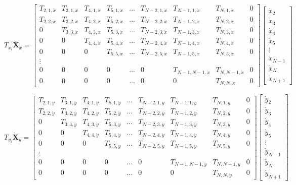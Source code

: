 \documentclass[12pt,letterpaper,titlepage]{article}
\begin{document}
\[
T_{\dot{x}_i}\mathbf{\dot{X}}_{\dot{x}} = \begin{bmatrix}
T_{2,1,\dot{x}}&T_{3,1,\dot{x}}&T_{4,1,\dot{x}}&T_{5,1,\dot{x}}&\hdots&T_{N-2,1,\dot{x}}&T_{N-1,1,\dot{x}}&T_{N,1,\dot{x}}&0\\
T_{2,2,\dot{x}}&T_{3,2,\dot{x}}&T_{4,2,\dot{x}}&T_{5,2,\dot{x}}&\hdots&T_{N-2,2,\dot{x}}&T_{N-1,2,\dot{x}}&T_{N,2,\dot{x}}&0\\
0&T_{3,3,\dot{x}}&T_{4,3,\dot{x}}&T_{5,3,\dot{x}}&\hdots&T_{N-2,3,\dot{x}}&T_{N-1,3,\dot{x}}&T_{N,3,\dot{x}}&0\\
0&0&T_{4,4,\dot{x}}&T_{5,4,\dot{x}}&\hdots&T_{N-2,4,\dot{x}}&T_{N-1,4,\dot{x}}&T_{N,4,\dot{x}}&0\\
0&0&0&T_{5,5,\dot{x}}&\hdots&T_{N-2,5,\dot{x}}&T_{N-1,5,\dot{x}}&T_{N,5,\dot{x}}&0\\
\vdots\\
0&0&0&0&\hdots&0&T_{N-1,N-1,\dot{x}}&T_{N,N-1,\dot{x}}&0\\
0&0&0&0&\hdots&0&0&T_{N,N,\dot{x}}&0
\end{bmatrix}
\begin{bmatrix}
\dot{x}_2\\
\dot{x}_3\\
\dot{x}_4\\
\dot{x}_5\\
\vdots\\
\dot{x}_{N-1}\\
\dot{x}_{N}\\
\dot{x}_{N+1}
\end{bmatrix}
\]

\[
T_{\dot{y}_i}\mathbf{\dot{X}}_{\dot{y}} = \begin{bmatrix}
T_{2,1,\dot{y}}&T_{3,1,\dot{y}}&T_{4,1,\dot{y}}&T_{5,1,\dot{y}}&\hdots&T_{N-2,1,\dot{y}}&T_{N-1,1,\dot{y}}&T_{N,1,\dot{y}}&0\\
T_{2,2,\dot{y}}&T_{3,2,\dot{y}}&T_{4,2,\dot{y}}&T_{5,2,\dot{y}}&\hdots&T_{N-2,2,\dot{y}}&T_{N-1,2,\dot{y}}&T_{N,2,\dot{y}}&0\\
0&T_{3,3,\dot{y}}&T_{4,3,\dot{y}}&T_{5,3,\dot{y}}&\hdots&T_{N-2,3,\dot{y}}&T_{N-1,3,\dot{y}}&T_{N,3,\dot{y}}&0\\
0&0&T_{4,4,\dot{y}}&T_{5,4,\dot{y}}&\hdots&T_{N-2,4,\dot{y}}&T_{N-1,4,\dot{y}}&T_{N,4,\dot{y}}&0\\
0&0&0&T_{5,5,\dot{y}}&\hdots&T_{N-2,5,\dot{y}}&T_{N-1,5,\dot{y}}&T_{N,5,\dot{y}}&0\\
\vdots\\
0&0&0&0&\hdots&0&T_{N-1,N-1,\dot{y}}&T_{N,N-1,\dot{y}}&0\\
0&0&0&0&\hdots&0&0&T_{N,N,\dot{y}}&0
\end{bmatrix}
\begin{bmatrix}
\dot{y}_2\\
\dot{y}_3\\
\dot{y}_4\\
\dot{y}_5\\
\vdots\\
\dot{y}_{N-1}\\
\dot{y}_{N}\\
\dot{y}_{N+1}
\end{bmatrix}
\]
\end{document}

